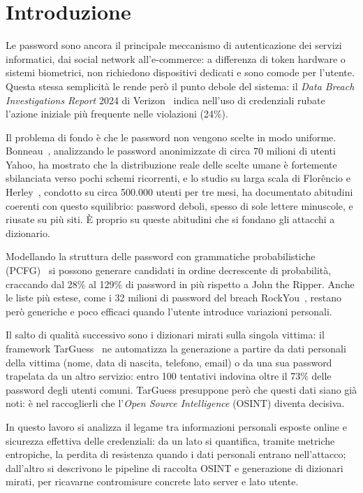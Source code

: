 \section{Introduzione}\label{sec:Introduzione}

Le password sono ancora il principale meccanismo di autenticazione dei servizi
informatici, dai social network all'e-commerce: a differenza di token hardware o
sistemi biometrici, non richiedono dispositivi dedicati e sono comode per l'utente.
Questa stessa semplicità le rende però il punto debole del sistema: il \emph{Data Breach Investigations Report} 2024 di
Verizon~\cite{verizon2024dbir} indica nell'uso di credenziali rubate l'azione
iniziale più frequente nelle violazioni (24\%).

Il problema di fondo è che le password non vengono scelte in modo uniforme.
Bonneau~\cite{bonneau2012}, analizzando le password anonimizzate di circa 70 milioni
di utenti Yahoo, ha mostrato che la distribuzione reale delle scelte umane è fortemente
sbilanciata verso pochi schemi ricorrenti, e lo studio su larga scala di
Flor\^{e}ncio e Herley~\cite{florencio2007}, condotto su circa 500.000 utenti per
tre mesi, ha documentato abitudini coerenti con questo squilibrio: password deboli,
spesso di sole lettere minuscole, e riusate su più siti.
È proprio su queste abitudini che si fondano gli attacchi a dizionario.

Modellando la struttura delle password con grammatiche probabilistiche (PCFG)~\cite{weir2009}
si possono generare candidati in ordine decrescente di probabilità, craccando dal
28\% al 129\% di password in più rispetto a John the Ripper.
Anche le liste più estese, come i 32 milioni di password del breach
RockYou~\cite{imperva2010rockyou}, restano però generiche e poco efficaci quando l'utente introduce
variazioni personali.

Il salto di qualità successivo sono i dizionari mirati sulla singola vittima:
il framework TarGuess~\cite{wang2016targuess} ne automatizza la generazione a partire
da dati personali della vittima (nome, data di nascita, telefono, email) o da una
sua password trapelata da un altro servizio: entro 100 tentativi indovina oltre il
73\% delle password degli utenti comuni. TarGuess presuppone però che questi dati
siano già noti: è nel raccoglierli che l'\emph{Open Source Intelligence} (OSINT)
diventa decisiva.

In questo lavoro si analizza il legame tra informazioni personali esposte online e
sicurezza effettiva delle credenziali: da un lato si quantifica, tramite metriche
entropiche, la perdita di resistenza quando i dati personali entrano
nell'attacco; dall'altro si descrivono le pipeline di raccolta OSINT e generazione
di dizionari mirati, per ricavarne contromisure concrete lato server e
lato utente.
